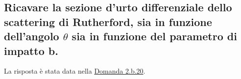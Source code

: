 \subsection[]{Ricavare la sezione d’urto differenziale dello scattering di Rutherford, sia in funzione dell’angolo $\theta$ sia in funzione del parametro di impatto b.}
\label{sec:5.c.1}
La risposta è stata data nella \hyperref[sec:2.b.20]{Domanda 2.b.20}.

